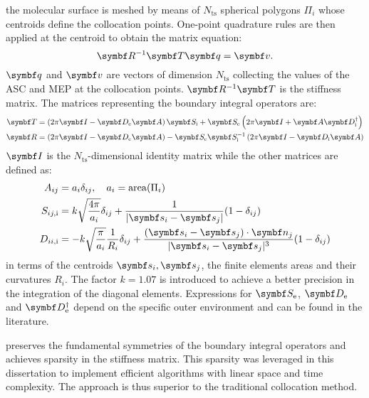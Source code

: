  the molecular surface is meshed by means of
$N_\mathrm{ts}$ spherical polygons $\Pi_i$ whose centroids define the
collocation points. One-point quadrature rules are then applied at the
centroid to obtain the matrix equation:
\begin{equation}
 \mat{R}^{-1}\mat{T} \vect{q}
  =
  \vect{v}.
\end{equation}
$\vect{q}$ and $\vect{v}$ are vectors of dimension $N_\mathrm{ts}$
collecting the values of the \acrshort{ASC} and \gls{MEP}
at the collocation points. $\mat{R}^{-1}\mat{T}$ is the stiffness
matrix.
The matrices representing the boundary integral operators are:
\begin{align}
  \mat{T} &=
  \left(2\pi\mat{I} - \mat{D}_\mathrm{e}\mat{A}\right)\mat{S}_\mathrm{i}
  +\mat{S}_\mathrm{e}\left(2\pi\mat{I} +
  \mat{A}\mat{D}_\mathrm{i}^\dagger\right) \\
  \mat{R} &=
  \left(2\pi\mat{I} - \mat{D}_\mathrm{e}\mat{A}\right) -
  \mat{S}_\mathrm{e}\mat{S}^{-1}_\mathrm{i}\left(2\pi\mat{I}-\mat{D}_\mathrm{i}\mat{A}\right)
\end{align}
$\mat{I}$ is the $N_\mathrm{ts}$-dimensional identity matrix while the
other matrices are defined as:
\begin{subequations}
  \begin{align}
    A_{ij} &= a_i\delta_{ij}, \quad a_i = \mathrm{area}(\Pi_i) \\
    S_{ij, \mathrm{i}} &=
    k\sqrt{\frac{4\pi}{a_i}}\delta_{ij} +
    \frac{1}{|\vect{s}_i-\vect{s}_j|}(1-\delta_{ij}) \\
    D_{ii, \mathrm{i}} &=
    -k\sqrt{\frac{\pi}{a_i}}\frac{1}{R_i}\delta_{ij}
    + \frac{(\vect{s}_i-\vect{s}_j)\cdot\vect{n}_j}{|\vect{s}_i-\vect{s}_j|^3}(1-\delta_{ij})
  \end{align}
\end{subequations}
in terms of the centroids $\vect{s}_i, \vect{s}_j$, the finite elements
areas and their curvatures $R_i$.
The factor $k=1.07$ is introduced to achieve a better precision in the
integration of the diagonal elements.\autocite{Tomasi2005-vm}
Expressions for $\mat{S}_\mathrm{e}$, $\mat{D}_\mathrm{e}$ and
$\mat{D}^\dagger_\mathrm{e}$ depend on the specific outer environment
and can be found in the literature.\autocite{Corni2002-dr, Frediani2004-er,
Tomasi2005-vm, Delgado2013-kd, DiRemigio2016-nn}

preserves the fundamental symmetries of the boundary integral operators
and achieves sparsity in the stiffness matrix.
This sparsity was leveraged in this dissertation to implement efficient algorithms with
linear space and time complexity. The approach is thus superior
to the traditional collocation method.

